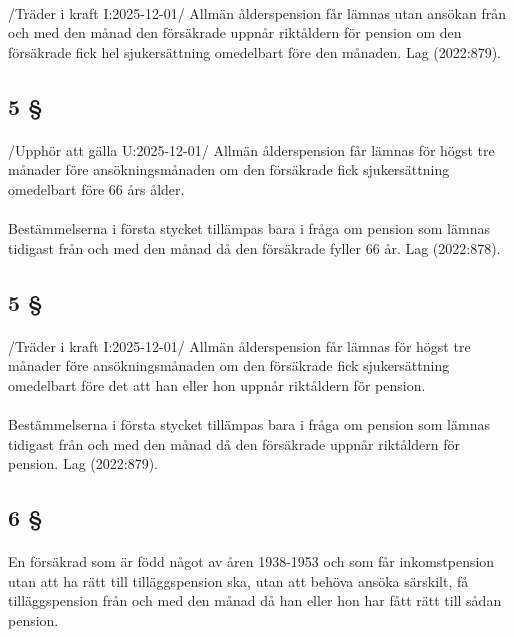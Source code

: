\documentclass[a4paper,notitlepage,openany,10pt]{book}
\begin{document}
\paragraph*{}
/Träder i kraft I:2025-12-01/
Allmän ålderspension får lämnas utan ansökan från och med den månad den försäkrade uppnår riktåldern för pension om den försäkrade fick hel sjukersättning omedelbart före den månaden.
Lag (2022:879).
\subsection*{5 §}
\paragraph*{}
/Upphör att gälla U:2025-12-01/
Allmän ålderspension får lämnas för högst tre månader före ansökningsmånaden om den försäkrade fick sjukersättning omedelbart före 66 års ålder.
\paragraph*{}
Bestämmelserna i första stycket tillämpas bara i fråga om pension som lämnas tidigast från och med den månad då den försäkrade fyller 66 år.
Lag (2022:878).
\subsection*{5 §}
\paragraph*{}
/Träder i kraft I:2025-12-01/
Allmän ålderspension får lämnas för högst tre månader före ansökningsmånaden om den försäkrade fick sjukersättning omedelbart före det att han eller hon uppnår riktåldern för pension.
\paragraph*{}
Bestämmelserna i första stycket tillämpas bara i fråga om pension som lämnas tidigast från och med den månad då den försäkrade uppnår riktåldern för pension.
Lag (2022:879).
\subsection*{6 §}
\paragraph*{}
En försäkrad som är född något av åren 1938-1953 och som får inkomstpension utan att ha rätt till tilläggspension ska, utan att behöva ansöka särskilt, få tilläggspension från och med den månad då han eller hon har fått rätt till sådan pension.
\end{document}
